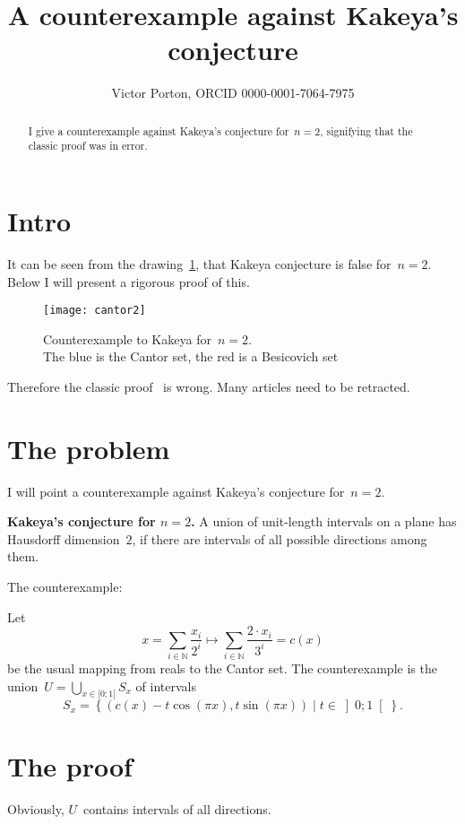 \documentclass[oneside,draft]{amsart}
\title{A counterexample against Kakeya's conjecture}
\author{Victor Porton, ORCID 0000-0001-7064-7975}
\newcommand{\setcond}[2]{\left\{#1\mid#2\right\}}
\begin{document}
\begin{abstract}
I give a counterexample against Kakeya's conjecture for~$n=2$, signifying that the classic proof was in error.
\end{abstract}

\maketitle  

\section{Intro}

It can be seen from the drawing~\ref{fig:example}, that Kakeya conjecture is false for~$n=2$. Below I will present a rigorous proof of this.

\begin{figure}[hbt]
    \centering
    \texttt{[image: cantor2]}
    \caption{Counterexample to Kakeya for~$n=2$.\\The blue is the Cantor set, the red is a Besicovich set}
    \label{fig:example}
\end{figure}

Therefore the classic proof~\cite{kakeya2d} is wrong. Many articles need to be retracted.

\section{The problem}

I will point a counterexample against Kakeya's conjecture for~$n=2$.

\textbf{Kakeya's conjecture for $n=2$.} A union of unit-length intervals on a plane has Hausdorff dimension~$2$, if there are intervals of all possible directions among them.

The counterexample:

Let \[ x = \sum_{i\in\mathbb{N}} \frac{x_i}{2^i} \mapsto \sum_{i\in\mathbb{N}} \frac{2\cdot x_i}{3^i} = c(x) \] be the usual mapping from reals to the Cantor set.
The counterexample is the union~$U=\bigcup_{x\in[0;1[}S_x$ of intervals \[ S_x = \setcond{(c(x)-t\cos(\pi x), t\sin(\pi x))}{t\in\left]0;1\right[}. \]

\section{The proof}

Obviously, $U$~contains intervals of all directions.
\end{document}
